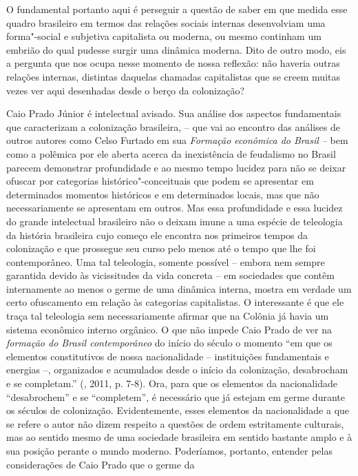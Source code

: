 O fundamental portanto aqui é perseguir a questão de saber em que medida
esse quadro brasileiro em termos das relações sociais internas
desenvolviam uma forma"-social e subjetiva capitalista ou moderna, ou
mesmo continham um embrião do qual pudesse surgir uma dinâmica moderna.
Dito de outro modo, eis a pergunta que nos ocupa nesse momento de nossa
reflexão: não haveria outras relações internas, distintas daquelas
chamadas capitalistas que se creem muitas vezes ver aqui desenhadas
desde o berço da colonização?

Caio Prado Júnior é intelectual avisado. Sua análise dos aspectos
fundamentais que caracterizam a colonização brasileira, -- que vai ao
encontro das análises de outros autores como Celso Furtado em sua
\emph{Formação econômica do Brasil --} bem como a polêmica por ele
aberta acerca da inexistência de feudalismo no Brasil parecem demonstrar
profundidade e ao mesmo tempo lucidez para não se deixar ofuscar por
categorias histórico"-conceituais que podem se apresentar em determinados
momentos históricos e em determinados locais, mas que não
necessariamente se apresentam em outros. Mas essa profundidade e essa
lucidez do grande intelectual brasileiro não o deixam imune a uma
espécie de teleologia da história brasileira cujo começo ele encontra
nos primeiros tempos da colonização e que prossegue seu curso pelo menos
até o tempo que lhe foi contemporâneo. Uma tal teleologia, somente
possível -- embora nem sempre garantida devido às vicissitudes da vida
concreta -- em sociedades que contêm internamente ao menos o germe de
uma dinâmica interna, mostra em verdade um certo ofuscamento em relação
às categorias capitalistas. O interessante é que ele traça tal
teleologia sem necessariamente afirmar que na Colônia já havia um
sistema econômico interno orgânico. O que não impede Caio Prado de ver
na \emph{formação do Brasil contemporâneo} do início do século  o
momento ``em que os elementos constitutivos de nossa nacionalidade --
instituições fundamentais e energias --, organizados e acumulados desde
o início da colonização, desabrocham e se completam.'' (, 2011, p.
7-8). Ora, para que os elementos da nacionalidade ``desabrochem'' e se
``completem'', é necessário que já estejam em germe durante os séculos
de colonização. Evidentemente, esses elementos da nacionalidade a que se
refere o autor não dizem respeito a questões de ordem estritamente
culturais, mas ao sentido mesmo de uma sociedade brasileira em sentido
bastante amplo e à sua posição perante o mundo moderno. Poderíamos,
portanto, entender pelas considerações de Caio Prado que o germe da
